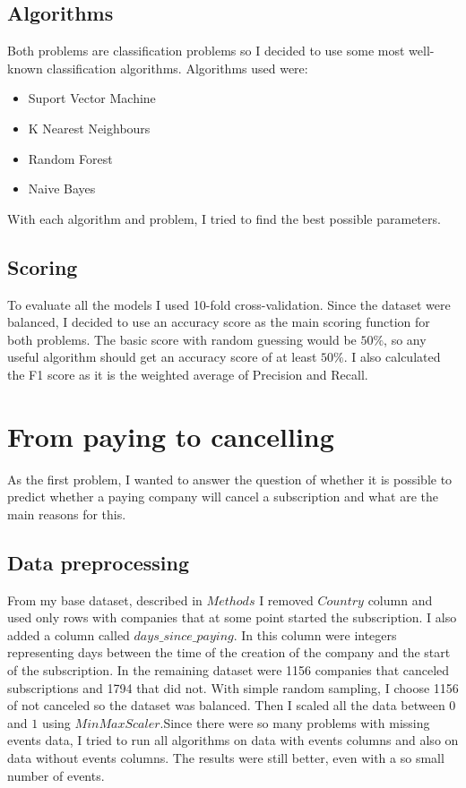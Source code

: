 \documentclass[fleqn,moreauthors,10pt]{ds_report}
\begin{document}
\subsection*{Algorithms}

Both problems are classification problems so I decided to use some most well-known classification algorithms. 
Algorithms used were:
\begin{itemize}
    \item Suport Vector Machine
    \item K Nearest Neighbours
    \item Random Forest
    \item Naive Bayes
\end{itemize}
With each algorithm and problem, I tried to find the best possible parameters. 

\subsection*{Scoring}

To evaluate all the models I used 10-fold cross-validation. Since the dataset were balanced, I decided to use an accuracy score as the main scoring function for both problems. The basic score with random guessing would be $ 50 \% $, so any useful algorithm should get an accuracy score of at least $ 50 \% $. I also calculated the F1 score as it is the weighted average of Precision and Recall. 

\section{From paying to cancelling}
As the first problem, I wanted to answer the question of whether it is possible to predict whether a paying company will cancel a subscription and what are the main reasons for this.

\subsection{Data preprocessing}
From my base dataset, described in $Methods$ I removed $Country$ column and used only rows with companies that at some point started the subscription. I also added a column called $days\_since\_paying$. In this column were integers representing days between the time of the creation of the company and the start of the subscription. In the remaining dataset were 1156 companies that canceled subscriptions and 1794 that did not. With simple random sampling, I choose 1156 of not canceled so the dataset was balanced. Then I scaled all the data  between $0$ and $1$ using $MinMaxScaler$.Since there were so many problems with missing events data, I tried to run all algorithms on data with events columns and also on data without events columns. The results were still better, even with a so small number of events.    
\end{document}
